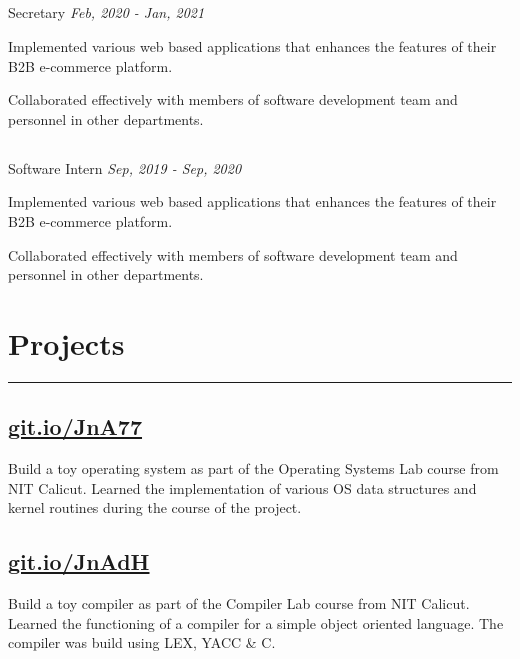 \documentclass[]{resume}
\begin{document}
\begin{minipage}[t]{0.66\textwidth}
\subsection{}
\noindent Secretary \hfill \emph{Feb, 2020 - Jan, 2021}
\vspace{1mm}
\begin{tightemize}
    \item Implemented various web based applications that enhances the features of their B2B e-commerce platform.
    \item Collaborated effectively with members of software development team and personnel in other departments.
\end{tightemize}
\sectionsep

\subsection{}
\noindent Software Intern \hfill \emph{Sep, 2019 - Sep, 2020}
\vspace{1mm}
\begin{tightemize}
    \item Implemented various web based applications that enhances the features of their B2B e-commerce platform.
    \item Collaborated effectively with members of software development team and personnel in other departments.
\end{tightemize}
\sectionsep

\section{Projects}
\noindent\rule{12.5cm}{0.8pt}

\subsection{\href{https://exposnitc.github.io/}{} \hfill \href{https://git.io/JnA77}{git.io/JnA77}}
\vspace{1mm}
Build a toy operating system as part of the Operating Systems Lab course from NIT Calicut. Learned the implementation of various OS data structures and kernel routines during the course of the project.
\sectionsep

\subsection{\href{https://silcnitc.github.io/}{} \hfill \href{https://git.io/JnAdH}{git.io/JnAdH}}
\vspace{1mm}
Build a toy compiler as part of the Compiler Lab course from NIT Calicut. Learned the functioning of a compiler for a simple object oriented language. The compiler was build using LEX, YACC \& C.
\sectionsep


\end{minipage}
\end{document}

